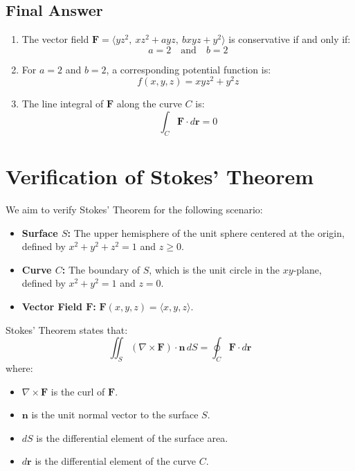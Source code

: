 \documentclass[11pt]{article}
\begin{document}
\newpage

\subsection{Final Answer}

\begin{enumerate}
    \item[(a)] The vector field \( \mathbf{F} = \langle y z^2, \ x z^2 + a y z, \ b x y z + y^2 \rangle \) is conservative if and only if:
    \[
    \boxed{ a = 2 \quad \text{and} \quad b = 2 }
    \]

    \item[(b)] For \( a = 2 \) and \( b = 2 \), a corresponding potential function is:
    \[
    \boxed{ f(x, y, z) = x y z^2 + y^2 z }
    \]

    \item[(c)] The line integral of \( \mathbf{F} \) along the curve \( C \) is:
    \[
    \boxed{ \int_{C} \mathbf{F} \cdot d\mathbf{r} = 0 }
    \]
\end{enumerate}




\newpage

\section{Verification of Stokes' Theorem}

We aim to verify Stokes' Theorem for the following scenario:

\begin{itemize}
    \item \textbf{Surface \( S \):} The upper hemisphere of the unit sphere centered at the origin, defined by \( x^2 + y^2 + z^2 = 1 \) and \( z \geq 0 \).
    \item \textbf{Curve \( C \):} The boundary of \( S \), which is the unit circle in the \( xy \)-plane, defined by \( x^2 + y^2 = 1 \) and \( z = 0 \).
    \item \textbf{Vector Field \( \mathbf{F} \):} \( \mathbf{F}(x, y, z) = \langle x, y, z \rangle \).
\end{itemize}

Stokes' Theorem states that:
\[
\iint_{S} (\nabla \times \mathbf{F}) \cdot \mathbf{n} \, dS = \oint_{C} \mathbf{F} \cdot d\mathbf{r}
\]
where:
\begin{itemize}
    \item \( \nabla \times \mathbf{F} \) is the curl of \( \mathbf{F} \).
    \item \( \mathbf{n} \) is the unit normal vector to the surface \( S \).
    \item \( dS \) is the differential element of the surface area.
    \item \( d\mathbf{r} \) is the differential element of the curve \( C \).
\end{itemize}
\end{document}
